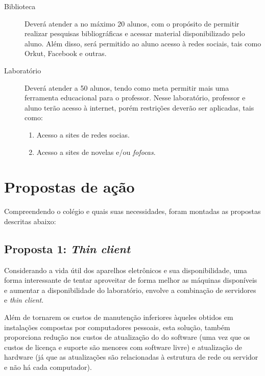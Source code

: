 \documentclass[a4paper,12pt]{report}
\begin{document}
            \begin{description}

                \item[Biblioteca] Deverá atender a no máximo 20 alunos, com o
                propósito de permitir realizar pesquisas bibliográficas e
                acessar material disponibilizado pelo aluno. Além disso, será
                permitido ao aluno acesso à redes sociais, tais como Orkut,
                Facebook e outras.

                \item[Laboratório] Deverá atender a 50 alunos, tendo como meta
                permitir mais uma ferramenta educacional para o professor. Nesse
                laboratório, professor e aluno terão acesso à internet, porém
                restrições deverão ser aplicadas, tais como:

                \begin{enumerate}

                    \item Acesso a sites de redes socias.

                    \item Acesso a sites de novelas e/ou \emph{fofocas}.

                \end{enumerate}

            \end{description}

        \section{Propostas de ação}
        \label{sc:laboratorio_proposta}
        Compreendendo o colégio e quais suas necessidades, foram montadas
        as propostas descritas abaixo:

            \subsection{Proposta 1: \emph{Thin client}}
            Considerando a vida útil dos aparelhos eletrônicos e sua
            disponibilidade, uma forma interessante de tentar aproveitar de
            forma melhor as máquinas disponíveis e aumentar a disponibilidade
            do laboratório, envolve a combinação de servidores e \emph{thin
            client}.

            Além de tornarem os custos de manutenção inferiores àqueles
            obtidos em instalações compostas por computadores pessoais, esta
            solução, também proporciona redução nos custos de atualização do
            do software (uma vez que os custos de licença e suporte são
            menores com software livre) e atualização de hardware (já que as
            atualizações são relacionadas à estrutura de rede ou servidor e não
            há cada computador).
\end{document}
